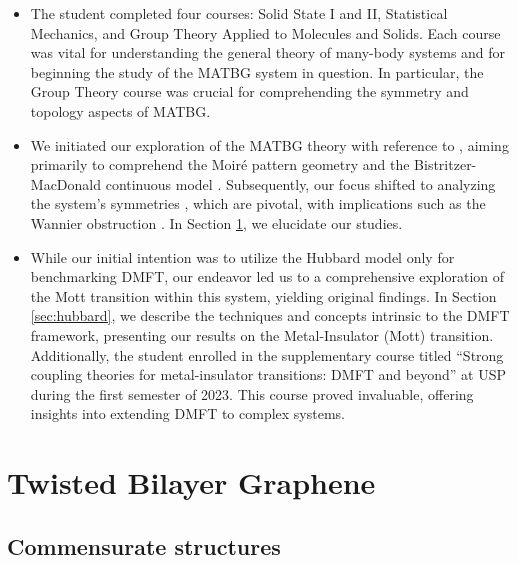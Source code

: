 \documentclass[12pt]{report}
\begin{document}
\begin{itemize}
\item The student completed four courses: Solid State I and II, Statistical Mechanics, and Group Theory Applied to Molecules and Solids. Each course was vital for understanding the general theory of many-body systems and for beginning the study of the MATBG system in question. In particular, the Group Theory course was crucial for comprehending the symmetry and topology aspects of MATBG.

\item We initiated our exploration of the MATBG theory with reference to \cite{handbook2019}, aiming primarily to comprehend the Moiré pattern geometry and the Bistritzer-MacDonald continuous model \cite{macdonald2011}. Subsequently, our focus shifted to analyzing the system's symmetries \cite{thesis_rennella}, which are pivotal, with implications such as the Wannier obstruction \cite{zou2018}. In Section \ref{sec:tbg}, we elucidate our studies.

\item While our initial intention was to utilize the Hubbard model only for benchmarking DMFT, our endeavor led us to a comprehensive exploration of the Mott transition within this system, yielding original findings. In Section \ref{sec:hubbard}, we describe the techniques and concepts intrinsic to the DMFT framework, presenting our results on the Metal-Insulator (Mott) transition. Additionally, the student enrolled in the supplementary course titled ``Strong coupling theories for metal-insulator transitions: DMFT and beyond'' at USP during the first semester of 2023. This course proved invaluable, offering insights into extending DMFT to complex systems.
\end{itemize}


\section{Twisted Bilayer Graphene} \label{sec:tbg}

\subsection{Commensurate structures} \label{sec:tbg_geom}
\end{document}
